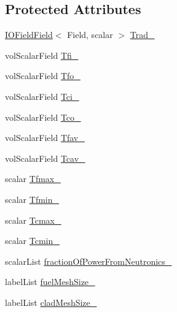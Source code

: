 \subsection*{Protected Attributes}
\begin{DoxyCompactItemize}
\item 
\hyperlink{classFoam_1_1IOFieldField}{I\+O\+Field\+Field}$<$ Field, scalar $>$ \hyperlink{classFoam_1_1powerModels_1_1nuclearFuelPin_a22d48bd29c42258de0a8c6a599dafecd}{Trad\+\_\+}
\item 
vol\+Scalar\+Field \hyperlink{classFoam_1_1powerModels_1_1nuclearFuelPin_ae5113713ca510bd2c780a3a42d570b68}{Tfi\+\_\+}
\item 
vol\+Scalar\+Field \hyperlink{classFoam_1_1powerModels_1_1nuclearFuelPin_aafbf0ec9a477530a70c839a32695007c}{Tfo\+\_\+}
\item 
vol\+Scalar\+Field \hyperlink{classFoam_1_1powerModels_1_1nuclearFuelPin_ae311ccceb3b1ab13497cfad4120f30ba}{Tci\+\_\+}
\item 
vol\+Scalar\+Field \hyperlink{classFoam_1_1powerModels_1_1nuclearFuelPin_a284ecf0fcaa736dfb6c22cb4f2e432f8}{Tco\+\_\+}
\item 
vol\+Scalar\+Field \hyperlink{classFoam_1_1powerModels_1_1nuclearFuelPin_ae27e97dd26523cd7de88fb4d2d8970d2}{Tfav\+\_\+}
\item 
vol\+Scalar\+Field \hyperlink{classFoam_1_1powerModels_1_1nuclearFuelPin_a7f0f167e5eca86beb5241b243ba9b5ec}{Tcav\+\_\+}
\item 
scalar \hyperlink{classFoam_1_1powerModels_1_1nuclearFuelPin_a41838f208df78067c90a2b0af6b20e5f}{Tfmax\+\_\+}
\item 
scalar \hyperlink{classFoam_1_1powerModels_1_1nuclearFuelPin_ac11ce3c46014e65515c96993a4039cf2}{Tfmin\+\_\+}
\item 
scalar \hyperlink{classFoam_1_1powerModels_1_1nuclearFuelPin_abfeb31e2295099d7d3ce3d07d53907d4}{Tcmax\+\_\+}
\item 
scalar \hyperlink{classFoam_1_1powerModels_1_1nuclearFuelPin_ac0e454e9e139c138d711fba06744779b}{Tcmin\+\_\+}
\item 
scalar\+List \hyperlink{classFoam_1_1powerModels_1_1nuclearFuelPin_a9a9fb1406beb9bc51f2e2ccc35e6fd27}{fraction\+Of\+Power\+From\+Neutronics\+\_\+}
\item 
label\+List \hyperlink{classFoam_1_1powerModels_1_1nuclearFuelPin_a7adeb17cd9325c9ab59764e067b2c335}{fuel\+Mesh\+Size\+\_\+}
\item 
label\+List \hyperlink{classFoam_1_1powerModels_1_1nuclearFuelPin_afa0b03f75735831b28e2ee5b9d607ccf}{clad\+Mesh\+Size\+\_\+}

\end{DoxyCompactItemize}
